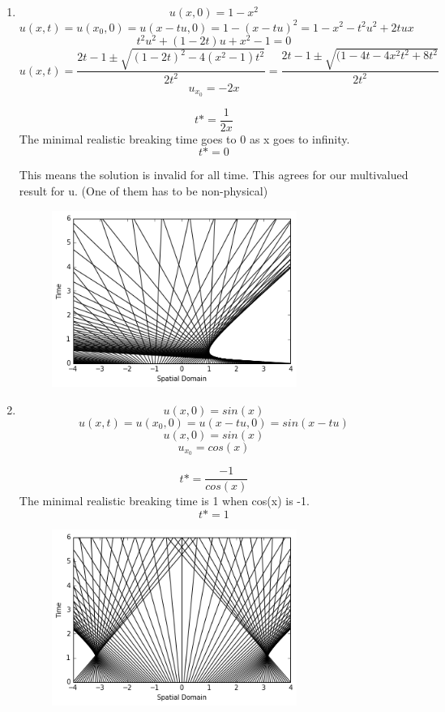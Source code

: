 \documentclass[a4paper]{article}
\begin{document}
\begin{enumerate}
\begin{enumerate}
\begin{figure}[H]
 \end{figure}
\item \[u(x,0)= 1-x^2\]
	\[u(x,t) = u(x_0,0)=u(x - t u,0) =1- (x-tu)^2 = 1-x^2 -t^2u^2+2tux \]
	\[t^2u^2+ (1-2t)u+ x^2-1=0 \]
	\[u(x,t)= \frac{2t-1 \pm \sqrt{(1-2t)^2-4(x^2-1)t^2}}{2t^2} =\frac{2t-1 \pm \sqrt{(1-4t-4x^2t^2+8t^2}}{2t^2} \]
\[u_{x_0} = -2x\]

\[t* = \frac{1}{2x}\]	 
The minimal realistic breaking time goes to 0 as x goes to infinity.
\[ t* =0 \]

This means the solution is invalid for all time. This agrees for our multivalued result for u. (One of them has to be non-physical)
 \begin{figure}[H] 
 	\centering
 	\includegraphics[width=8cm]{5_2.png}
 	
 \end{figure}
\item \[u(x,0)= sin(x)\]
	\[u(x,t) = u(x_0,0)=u(x - t u,0) =sin(x-tu) \]
\[u(x,0)= sin(x)\]
\[u_{x_0} = cos(x)\]

\[t* = \frac{-1}{cos(x)}\]	 
The minimal realistic breaking time is 1 when cos(x) is -1.
\[ t* =1 \]

 \begin{figure}[H] 
 	\centering
 	\includegraphics[width=8cm]{5_3.png}
 	
 \end{figure}

	\end{enumerate} 

	\end{enumerate} 
\end{document}
